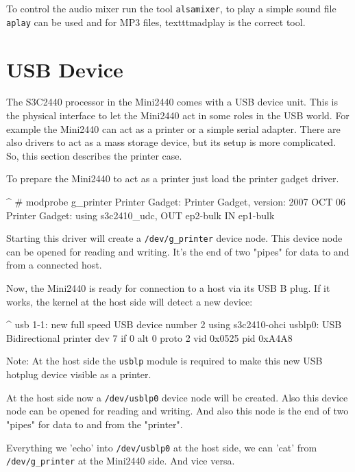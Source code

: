 To control the audio mixer run the tool \texttt{alsamixer}, to play a simple
sound file \texttt{aplay} can be used and for MP3 files, texttt{madplay} is the
correct tool.


\section{USB Device}					\label{sec:USBgadget}

The S3C2440 processor in the Mini2440 comes with a USB device unit. This is
the physical interface to let the Mini2440 act in some roles in the USB world.
For example the Mini2440 can act as a printer or a simple serial adapter.
There are also drivers to act as a mass storage device, but its setup is more
complicated. So, this section describes the printer case.

To prepare the Mini2440 to act as a printer just load the printer gadget driver.

\begin{ptxshell}[escapechar=|]{^}
# modprobe g_printer
Printer Gadget: Printer Gadget, version: 2007 OCT 06
Printer Gadget: using s3c2410_udc, OUT ep2-bulk IN ep1-bulk
\end{ptxshell}

Starting this driver will create a \texttt{/dev/g\_printer} device node. This
device node can be opened for reading and writing. It's the end of two
"pipes" for data to and from a connected host.

Now, the Mini2440 is ready for connection to a host via its USB B plug.
If it works, the kernel at the host side will detect a new device:

\begin{ptxshell}[escapechar=|]{^}
usb 1-1: new full speed USB device number 2 using s3c2410-ohci
usblp0: USB Bidirectional printer dev 7 if 0 alt 0 proto 2 vid 0x0525 pid 0xA4A8
\end{ptxshell}

Note: At the host side the \texttt{usblp} module is required to make this new
USB hotplug device visible as a printer.

At the host side now a \texttt{/dev/usblp0} device node will be created. Also
this device node can be opened for reading and writing. And also this node is
the end of two "pipes" for data to and from the "printer".

Everything we 'echo' into \texttt{/dev/usblp0} at the host side, we can 'cat'
from \texttt{/dev/g\_printer} at the Mini2440 side. And vice versa.

